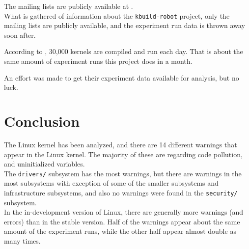 \documentclass[a4paper,11pt]{report}
\begin{document}
The mailing lists are publicly available at 
\cite{kbuildrobot,kbuildrobotall,kbuildlkp}.
\\

What is gathered of information about the \texttt{kbuild-robot} project, only 
the mailing lists are publicly available, and the experiment run data is thrown 
away soon after. 

According to \cite{summit2012,summit2013}, 30,000 kernels are compiled and run
each day. That is about the same amount of experiment runs this project does in 
a month.

An effort was made to get their experiment data available for analysis, but no 
luck.  

            \newpage
            \chapter{Conclusion}
The Linux kernel has been analyzed, and there are 14 different 
warnings that appear in the Linux kernel. The majority of these are regarding 
code pollution, and uninitialized variables.
\\

The \texttt{drivers/} subsystem has the most warnings, but there are warnings 
in the most subsystems with exception of some of the smaller subsystems and 
infrastructure subsystems, and also no warnings were found in the 
\texttt{security/} subsystem.
\\

In the in-development version of Linux, there are generally more warnings (and
errors) than in the stable version. Half of the warnings appear about the same
amount of the experiment runs, while the other half appear almost double as 
many times.




\newpage




            \newpage
\end{document}
